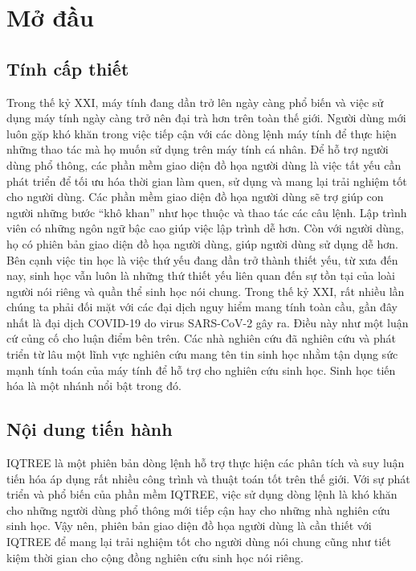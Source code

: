\documentclass[12pt]{report}
\begin{document}
\newpage
{}
\listoffigures

\newpage
{}
\setcounter{page}{1}
\chapter{Mở đầu}
\label{chap:intro}
\section{Tính cấp thiết}
Trong thế kỷ XXI, máy tính đang dần trở lên ngày càng phổ biến và việc sử dụng máy tính ngày càng trở nên đại trà hơn trên toàn thế giới. Người dùng mới luôn gặp khó khăn trong việc tiếp cận với các dòng lệnh máy tính để thực hiện những thao tác mà họ muốn sử dụng trên máy tính cá nhân. Để hỗ trợ người dùng phổ thông, các phần mềm giao diện đồ họa người dùng là việc tất yếu cần phát triển để tối ưu hóa thời gian làm quen, sử dụng và mang lại trải nghiệm tốt cho người dùng. Các phần mềm giao diện đồ họa người dùng sẽ trợ giúp con người những bước “khô khan” như học thuộc và thao tác các câu lệnh. 
Lập trình viên có những ngôn ngữ bậc cao giúp việc lập trình dễ hơn. Còn với người dùng, họ có phiên bản giao diện đồ họa người dùng, giúp người dùng sử dụng dễ hơn.
Bên cạnh việc tin học là việc thứ yếu đang dần trở thành thiết yếu, từ xưa đến nay, sinh học vẫn luôn là những thứ thiết yếu liên quan đến sự tồn tại của loài người nói riêng và quần thể sinh học nói chung. Trong thế kỷ XXI, rất nhiều lần chúng ta phải đối mặt với các đại dịch nguy hiểm mang tính toàn cầu, gần đây nhất là đại dịch COVID-19 do virus SARS-CoV-2 gây ra. Điều này như một luận cứ củng cố cho luận điểm bên trên. Các nhà nghiên cứu đã nghiên cứu và phát triển từ lâu một lĩnh vực nghiên cứu mang tên tin sinh học nhằm tận dụng sức mạnh tính toán của máy tính để hỗ trợ cho nghiên cứu sinh học. Sinh học tiến hóa là một nhánh nổi bật trong đó.

\section{Nội dung tiến hành}
IQTREE là một phiên bản dòng lệnh hỗ trợ thực hiện các phân tích và suy luận tiến hóa áp dụng rất nhiều công trình và thuật toán tốt trên thế giới. Với sự phát triển và phổ biến của phần mềm IQTREE, việc sử dụng dòng lệnh là khó khăn cho những người dùng phổ thông mới tiếp cận hay cho những nhà nghiên cứu sinh học. Vậy nên, phiên bản giao diện đồ họa người dùng là cần thiết với IQTREE để mang lại trải nghiệm tốt cho người dùng nói chung cũng như tiết kiệm thời gian cho cộng đồng nghiên cứu sinh học nói riêng.
\end{document}
